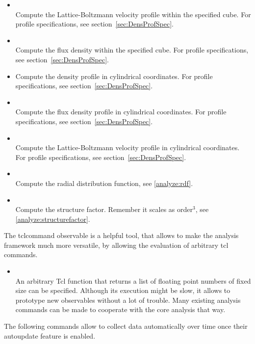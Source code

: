 \begin{itemize}
    \item {}    \\
          Compute the Lattice-Boltzmann velocity profile within the specified cube.
          For profile specifications, see section~\ref{sec:DensProfSpec}.

    \item {}    \\
          Compute the flux density within the specified cube.
          For profile specifications, see section~\ref{sec:DensProfSpec}.
    \item {}
        Compute the density profile in cylindrical coordinates.
          For profile specifications, see section~\ref{sec:DensProfSpec}.
    \item {} \\
        Compute the flux density profile in cylindrical coordinates.
          For profile specifications, see section~\ref{sec:DensProfSpec}.
    \item {} \\
        Compute the Lattice-Boltzmann velocity profile in cylindrical coordinates.
          For profile specifications, see section~\ref{sec:DensProfSpec}.
    \item {} \\
        Compute the radial distribution function, see \ref{analyze:rdf}.
    \item {} \\
        Compute the structure factor. Remember it scales as order$^3$, see \ref{analyze:structurefactor}.
      \end{itemize}
The tclcommand observable is a helpful tool, that allows to make the 
analysis framework much more versatile, by allowing
the evaluation of arbitrary tcl commands.
  \begin{itemize}
    \item {} \\
        An arbitrary Tcl function that returns a list of floating point numbers of fixed size
         can be specified. Although its execution might be slow, it allows 
        to prototype new observables without a lot of trouble.
        Many existing analysis commands can be made to cooperate with the core analysis that way.
  \end{itemize}
The following commands allow to collect data automatically over time
once their autoupdate feature is enabled.

